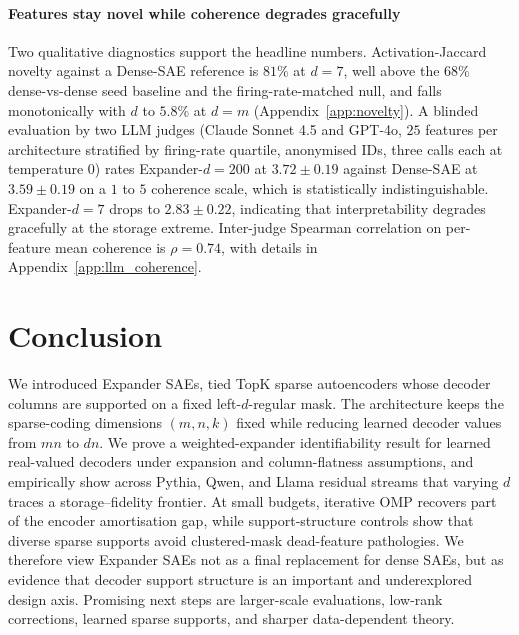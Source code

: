 \documentclass{article}
\theoremstyle{plain}
\theoremstyle{definition}
\theoremstyle{remark}
\begin{document}
\paragraph{Features stay novel while coherence degrades gracefully}
Two qualitative diagnostics support the headline numbers. Activation-Jaccard novelty against a Dense-SAE reference is $81\%$ at $d{=}7$, well above the $68\%$ dense-vs-dense seed baseline and the firing-rate-matched null, and falls monotonically with $d$ to $5.8\%$ at $d{=}m$ (Appendix~\ref{app:novelty}). A blinded evaluation by two LLM judges (Claude Sonnet 4.5 and GPT-4o, $25$ features per architecture stratified by firing-rate quartile, anonymised IDs, three calls each at temperature $0$) rates Expander-$d{=}200$ at $3.72 \pm 0.19$ against Dense-SAE at $3.59 \pm 0.19$ on a $1$ to $5$ coherence scale, which is statistically indistinguishable. Expander-$d{=}7$ drops to $2.83 \pm 0.22$, indicating that interpretability degrades gracefully at the storage extreme. Inter-judge Spearman correlation on per-feature mean coherence is $\rho = 0.74$, with details in Appendix~\ref{app:llm_coherence}.

\section{Conclusion}
\label{sec:conclusion}

We introduced Expander SAEs, tied TopK sparse autoencoders whose decoder columns are supported on a fixed left-$d$-regular mask. The architecture keeps the sparse-coding dimensions $(m,n,k)$ fixed while reducing learned decoder values from $mn$ to $dn$. We prove a weighted-expander identifiability result for learned real-valued decoders under expansion and column-flatness assumptions, and empirically show across Pythia, Qwen, and Llama residual streams that varying $d$ traces a storage--fidelity frontier. At small budgets, iterative OMP recovers part of the encoder amortisation gap, while support-structure controls show that diverse sparse supports avoid clustered-mask dead-feature pathologies. We therefore view Expander SAEs not as a final replacement for dense SAEs, but as evidence that decoder support structure is an important and underexplored design axis. Promising next steps are larger-scale evaluations, low-rank corrections, learned sparse supports, and sharper data-dependent theory.






\onecolumn
\appendix
\end{document}
